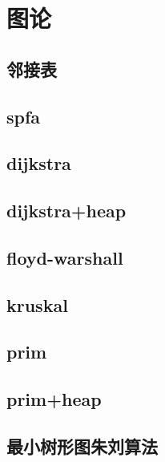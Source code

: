 \section{图论}
\subsection{邻接表}


\subsection{spfa}


\subsection{dijkstra}


\subsection{dijkstra+heap}


\subsection{floyd-warshall}


\subsection{kruskal}


\subsection{prim}


\subsection{prim+heap}


\subsection{最小树形图朱刘算法}


